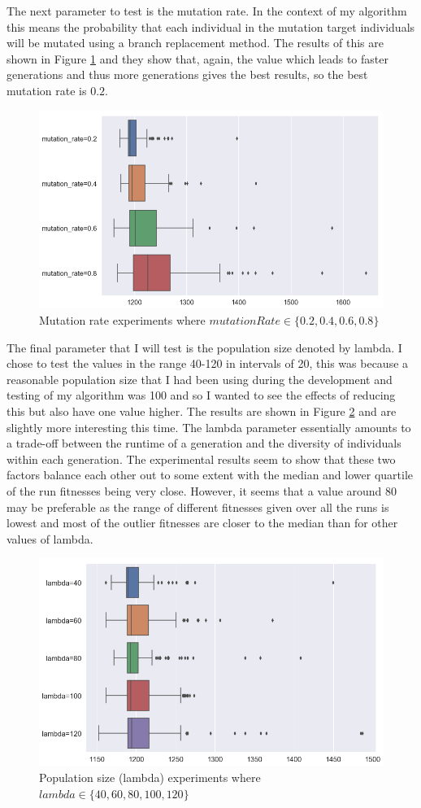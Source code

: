 \documentclass[11pt]{article}
\begin{document}
The next parameter to test is the mutation rate.
In the context of my algorithm this means the probability that each individual in the mutation target individuals will be mutated using a branch replacement method.
The results of this are shown in Figure \ref{fig:mutation_rate} and they show that, again, the value which leads to faster generations and thus more generations gives the best results, so the best mutation rate is $0.2$.

\begin{figure}[ht]
  \includegraphics[scale=0.5]{mutation_rate}
  \centering
  \caption{Mutation rate experiments where $mutationRate \in \{0.2, 0.4, 0.6, 0.8\}$}
  \label{fig:mutation_rate}
\end{figure}

The final parameter that I will test is the population size denoted by lambda.
I chose to test the values in the range 40-120 in intervals of 20, this was because a reasonable population size that I had been using during the development and testing of my algorithm was 100 and so I wanted to see the effects of reducing this but also have one value higher.
The results are shown in Figure \ref{fig:lambda} and are slightly more interesting this time.
The lambda parameter essentially amounts to a trade-off between the runtime of a generation and the diversity of individuals within each generation.
The experimental results seem to show that these two factors balance each other out to some extent with the median and lower quartile of the run fitnesses being very close.
However, it seems that a value around $80$ may be preferable as the range of different fitnesses given over all the runs is lowest and most of the outlier fitnesses are closer to the median than for other values of lambda.

\begin{figure}[ht]
  \includegraphics[scale=0.5]{lambda}
  \centering
  \caption{Population size (lambda) experiments where $lambda \in \{40, 60, 80, 100, 120\}$}
  \label{fig:lambda}
\end{figure}
\end{document}
